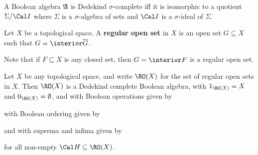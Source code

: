  A Boolean algebra $\frak A$ is Dedekind
$\sigma$-complete iff it is isomorphic to a quotient $\Sigma/\Cal I$
where $\Sigma$ is a $\sigma$-algebra of sets and $\Cal I$
is a $\sigma$-ideal of $\Sigma$.


 Let $X$ be a topological space.   A
{\bf regular open set} in $X$ is an open set $G\subseteq X$ such that
$G=\interior\overline{G}$.

Note that if $F\subseteq X$ is any closed set, then $G=\interior F$ is a
regular open set.

 Let $X$ be any topological space, and write
$\RO(X)$ for the set of regular open sets in $X$.   Then $\RO(X)$ is a
Dedekind complete Boolean algebra, with $1_{\RO(X)}=X$ and
$0_{\RO(X)}=\emptyset$, and with Boolean operations given by



\noindent with Boolean ordering given by


\noindent and with suprema and infima given by


\noindent for all non-empty $\Cal H\subseteq\RO(X)$.


